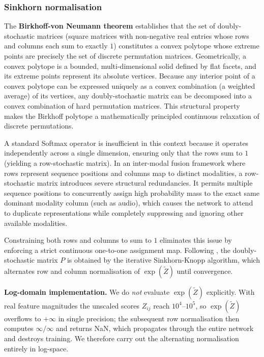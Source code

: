 \documentclass[11pt,a4paper]{article}
\begin{document}
	\subsubsection*{Sinkhorn normalisation}
	The \textbf{Birkhoff-von Neumann theorem} \cite{birkhoff1946} establishes that the set of doubly-stochastic matrices (square matrices with non-negative real entries whose rows and columns each sum to exactly $1$) constitutes a convex polytope whose extreme points are precisely the set of discrete permutation matrices. Geometrically, a convex polytope is a bounded, multi-dimensional solid defined by flat facets, and its extreme points represent its absolute vertices. Because any interior point of a convex polytope can be expressed uniquely as a convex combination (a weighted average) of its vertices, any doubly-stochastic matrix can be decomposed into a convex combination of hard permutation matrices. This structural property makes the Birkhoff polytope a mathematically principled continuous relaxation of discrete permutations.
	
	A standard Softmax operator is insufficient in this context because it operates independently across a single dimension, ensuring only that the rows sum to $1$ (yielding a row-stochastic matrix). In an inter-modal fusion framework where rows represent sequence positions and columns map to distinct modalities, a row-stochastic matrix introduces severe structural redundancies. It permits multiple sequence positions to concurrently assign high probability mass to the exact same dominant modality column (such as audio), which causes the network to attend to duplicate representations while completely suppressing and ignoring other available modalities. 
	
	Constraining both rows and columns to sum to $1$ eliminates this issue by enforcing a strict continuous one-to-one assignment map. Following \cite{mena2018}, the doubly-stochastic matrix $P$ is obtained by the iterative Sinkhorn-Knopp algorithm, which alternates row and column normalisation of $\exp(\tilde{Z})$ until convergence.
	
	\textbf{Log-domain implementation.} We do \emph{not} evaluate $\exp(\tilde{Z})$ explicitly. With real feature magnitudes the unscaled scores $Z_{ij}$ reach $10^{4}$--$10^{5}$, so $\exp(\tilde{Z})$ overflows to $+\infty$ in single precision; the subsequent row normalisation then computes $\infty/\infty$ and returns NaN, which propagates through the entire network and destroys training. We therefore carry out the alternating normalisation entirely in log-space.
	
\end{document}
